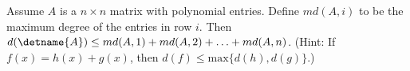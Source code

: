 Assume $A$ is a $n \times n$ matrix with polynomial entries.  Define $md(A,i)$ to be the maximum degree of the entries in row $i$. Then $d(\detname{A})\leq md(A,1)+md(A,2)+\ldots+md(A,n)$. (Hint: If $f(x)=h(x)+g(x)$, then $d(f)\leq \text{max}\{d(h),d(g)\}$.)